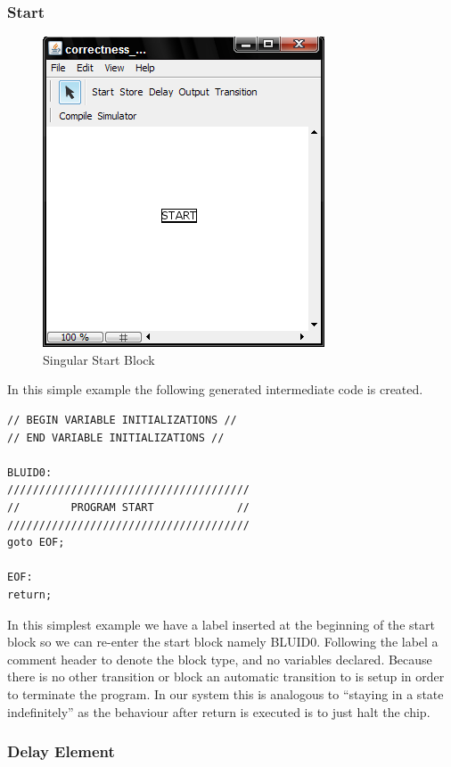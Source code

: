 \subsubsection{Start}
\begin{figure}[htb]
	\centering
	\includegraphics[width=\imgmedphoto]{./images/correctness_ex_start.png}
	\caption{Singular Start Block}
	\label{fig:correctness_ex_start}
\end{figure}
In this simple example the following generated intermediate code  is created.

\begin{minipage}{\textwidth}
\begin{lstlisting}[frame=single]
// BEGIN VARIABLE INITIALIZATIONS //
// END VARIABLE INITIALIZATIONS //

BLUID0:
//////////////////////////////////////
//        PROGRAM START             //
//////////////////////////////////////
goto EOF;

EOF:
return;
\end{lstlisting}
\end{minipage}

In this simplest example we have a label inserted at the beginning of the start block so we can re-enter the start block namely BLUID0. Following the label a comment header to denote the block type, and no variables declared.  Because there is no other transition or block an automatic transition to  is setup in order to terminate the program. In our system this is analogous to ``staying in a state indefinitely'' as the behaviour after return is executed is to just halt the chip.


\subsubsection{Delay Element}

